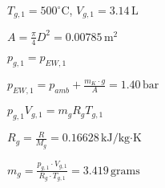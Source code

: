 \( T_{g,1} = 500^\circ \text{C} \), \( V_{g,1} = 3.14 \, \text{L} \)  

\( A = \frac{\pi}{4} D^2 = 0.00785 \, \text{m}^2 \)  

\( p_{g,1} = p_{EW,1} \)  

\( p_{EW,1} = p_{amb} + \frac{m_K \cdot g}{A} = 1.40 \, \text{bar} \)  

\( p_{g,1} V_{g,1} = m_g R_g T_{g,1} \)  

\( R_g = \frac{R}{M_g} = 0.16628 \, \text{kJ/kg·K} \)  

\( m_g = \frac{p_{g,1} \cdot V_{g,1}}{R_g \cdot T_{g,1}} = 3.419 \, \text{grams} \)